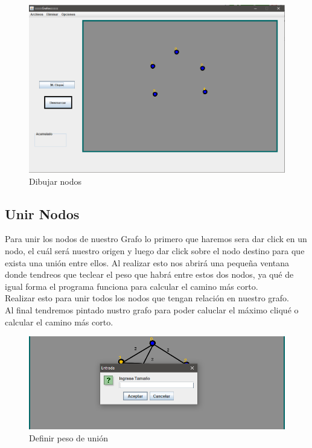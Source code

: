 \begin{figure}[h!]
\centering
\includegraphics[scale=.5]{img/grafo.PNG}
\caption{Dibujar nodos}
\label{Comandos}
\end{figure}

\subsection{Unir Nodos}
Para unir los nodos de nuestro Grafo lo primero que haremos sera dar click en un nodo, el cuál será nuestro origen y luego dar click sobre el nodo destino para que exista una unión entre ellos. Al realizar esto nos abrirá una pequeña ventana donde tendreos que teclear el peso que habrá entre estos dos nodos, ya qué de igual forma el programa funciona para calcular el camino más corto.
\\
Realizar esto para unir todos los nodos que tengan relación en nuestro grafo.
\\
Al final tendremos pintado nustro grafo para poder caluclar el máximo cliqué o calcular el camino más corto. 

\begin{figure}[h!]
\centering
\includegraphics[scale=.35]{img/alert.PNG}
\caption{Definir peso de unión}
\label{Comandos}
\end{figure}

